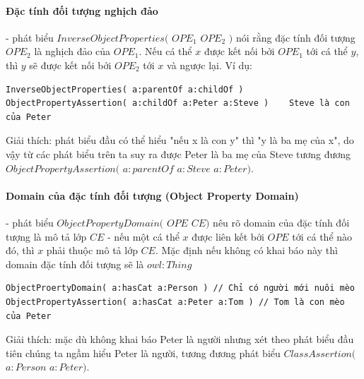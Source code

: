 \paragraph{Đặc tính đối tượng nghịch đảo} - phát biểu $InverseObjectProperties($ $OPE_{1}$ $OPE_{2}$ $)$ nói rằng đặc tính đối tượng $OPE_{2}$ là nghịch đảo của $OPE_{1}$. Nếu cá thể $x$ được kết nối bởi $OPE_{1}$ tới cá thể $y$, thì $y$ sẽ được kết nối bởi $OPE_{2}$ tới $x$ và ngược lại. Ví dụ:
\begin{verbatim}
InverseObjectProperties( a:parentOf a:childOf )
ObjectPropertyAssertion( a:childOf a:Peter a:Steve )	Steve là con của Peter
\end{verbatim}
Giải thích: phát biểu đầu có thể hiểu "nếu x là con y" thì "y là ba mẹ của x", do vậy từ các phát biểu trên ta suy ra được Peter là ba mẹ của Steve tương đương $ObjectPropertyAssertion($ $a:parentOf$ $a:Steve$ $a:Peter)$.

\paragraph{Domain của đặc tính đối tượng (Object Property Domain)} - phát biểu $ObjectPropertyDomain($ $OPE$ $CE)$ nêu rõ domain của đặc tính đối tượng là mô tả lớp $CE$ -  nếu một cá thể $x$ được liên kết bới $OPE$ tới cá thể nào đó, thì $x$ phải thuộc mô tả lớp $CE$. Mặc định nếu không có khai báo này thì domain đặc tính đối tượng sẽ là $owl:Thing$
\begin{verbatim}
ObjectProertyDomain( a:hasCat a:Person ) // Chỉ có người mới nuôi mèo
ObjectPropertyAssertion( a:hasCat a:Peter a:Tom ) // Tom là con mèo của Peter
\end{verbatim}
Giải thích: mặc dù không khai báo Peter là người nhưng xét theo phát biểu đầu tiên chúng ta ngầm hiểu Peter là người, tương đương phát biểu $ClassAssertion($ $a:Person$ $a:Peter)$.

